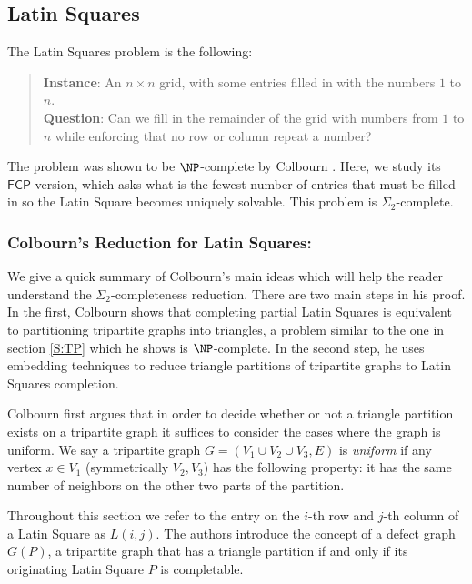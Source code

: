 \documentclass[runningheads,a4paper]{llncs}
\begin{document}
\subsection{Latin Squares}

The Latin Squares problem is the following:
\begin{quote}
\textbf{Instance}: An $n \times n$ grid, with some entries filled in with the numbers $1$ to $n$.\\
\textbf{Question}: Can we fill in the remainder of the grid with numbers from $1$ to $n$ while enforcing that no row or column repeat a number?
\end{quote}
The problem was shown to be $\NP$-complete by Colbourn \cite{colbourn1984complexity}. Here, we study its  $\mathsf{FCP}$ version, which asks what is the fewest number of entries that must be filled in so the Latin Square becomes uniquely solvable. This problem is $\Sigma_2$-complete. 

\subsubsection{Colbourn's Reduction for Latin Squares:}
We give a quick summary of Colbourn's main ideas which will help the reader understand the $\Sigma_2$-completeness reduction. There are two main steps in his proof. In the first, Colbourn shows that completing partial Latin Squares is equivalent to partitioning tripartite graphs into triangles, a problem similar to the one in section \ref{S:TP} which he shows is $\NP$-complete. In the second step, he uses embedding techniques to reduce triangle partitions of tripartite graphs to Latin Squares completion. 

Colbourn \cite{colbourn1984complexity} first argues that in order to decide whether or not a triangle partition exists on a tripartite graph it suffices to consider the cases where the graph is uniform. We say a tripartite graph $G = (V_1 \cup V_2 \cup V_3, E)$ is \emph{uniform} if any vertex $x \in V_1$ (symmetrically $V_2, V_3$) has the following property: it has the same number of neighbors on the other two parts of the partition. 

Throughout this section we refer to the entry on the $i$-th row and $j$-th column of a Latin Square as $L(i,j)$. The authors introduce the concept of a defect graph $G(P)$, a tripartite graph that has a triangle partition if and only if its originating Latin Square $P$ is completable. 
\end{document}
